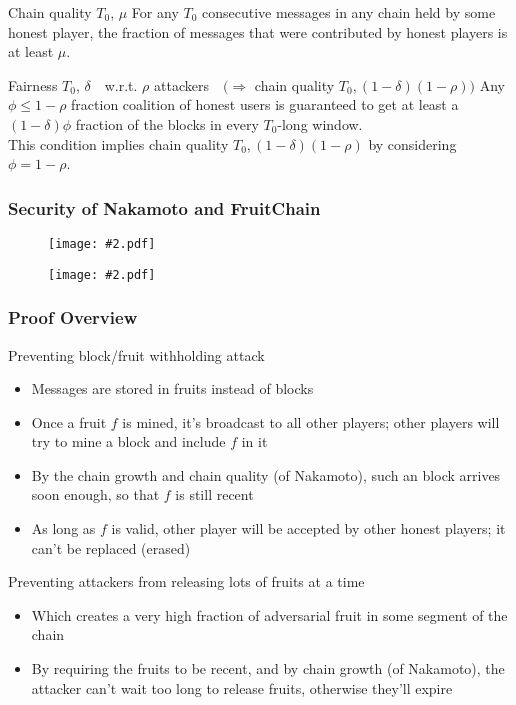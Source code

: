 \documentclass{beamer}
\newcommand{\insfig}[2][1]{
	\begin{figure}
		\texttt{[image: \#2.pdf]}
	\end{figure}
}
\newcommand{\insblk}[2]{
	\begin{block}{#1}
		\insfig{#2}
	\end{block}
}
\begin{document}
\begin{spacing}{1.2}
\begin{frame}
	\begin{block}{Chain quality $T_0$, $\mu$}
		For any $T_0$ consecutive messages in any chain held by some honest player, the fraction of messages that were contributed by honest players is at least $\mu$.
	\end{block}
	
	\begin{block}{Fairness $T_0$, $\delta$\ \ w.r.t. $\rho$ attackers \ \,$\big(\Rightarrow$ chain quality $T_0, (1-\delta)(1-\rho) \big)$}
		Any $\phi \leq 1 - \rho$ fraction coalition of honest users is guaranteed to get at least a $(1-\delta)\phi$ fraction of the blocks in every $T_0$-long window.\\
		This condition implies chain quality $T_0, (1-\delta)(1-\rho)$ by considering $\phi = 1 - \rho$.
	\end{block}
\end{frame}

\begin{frame}
	\frametitle{Security of Nakamoto and FruitChain}
	\insfig[0.95]{SoB1}
	\vspace{-11pt}
	\insfig[0.95]{SoB2}
\end{frame}

\begin{frame}
	\frametitle{Proof Overview}
	\begin{block}{Preventing block/fruit withholding attack}
		\begin{itemize}
		\item Messages are stored in fruits instead of blocks
		\item Once a fruit $f$ is mined, it's broadcast to all other players; other players will try to mine a block and include $f$ in it
		\item By the chain growth and chain quality (of Nakamoto), such an block arrives soon enough, so that $f$ is still recent
		\item As long as $f$ is valid, other player will be accepted by other honest players; it can't be replaced (erased)
		\end{itemize}
	\end{block}
	\begin{block}{Preventing attackers from releasing lots of fruits at a time}
		\begin{itemize}
			\item Which creates a very high fraction of adversarial fruit in some segment of the chain
			\item By requiring the fruits to be recent, and by chain growth (of Nakamoto), the attacker can't wait too long to release fruits, otherwise they'll expire
		\end{itemize} 
	\end{block}
\end{frame}
\end{spacing}
\end{document}
